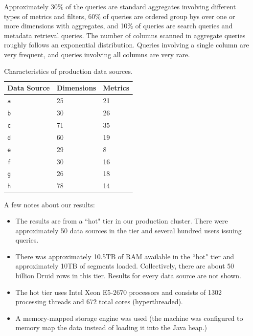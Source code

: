 \documentclass{sig-alternate-2013}
\begin{document}
Approximately 30\% of the queries are standard
aggregates involving different types of metrics and filters, 60\% of queries
are ordered group bys over one or more dimensions with aggregates, and 10\% of
queries are search queries and metadata retrieval queries. The number of
columns scanned in aggregate queries roughly follows an exponential
distribution. Queries involving a single column are very frequent, and queries
involving all columns are very rare.

\begin{table}
  \centering
  \begin{tabular}{| l | l | l |}
    \hline
    \textbf{Data Source} & \textbf{Dimensions} & \textbf{Metrics} \\ \hline
    \texttt{a} & 25 & 21 \\ \hline
    \texttt{b} & 30 & 26 \\ \hline
    \texttt{c} & 71 & 35 \\ \hline
    \texttt{d} & 60 & 19 \\ \hline
    \texttt{e} & 29 & 8 \\ \hline
    \texttt{f} & 30 & 16 \\ \hline
    \texttt{g} & 26 & 18 \\ \hline
    \texttt{h} & 78 & 14 \\ \hline
  \end{tabular}
  \caption{Characteristics of production data sources.}
  \label{tab:datasources}
\end{table}

A few notes about our results:
\begin{itemize}[leftmargin=*,beginpenalty=5000,topsep=0pt]
\item The results are from a ``hot" tier in our production cluster. There were
approximately 50 data sources in the tier and several hundred users issuing
queries.

\item There was approximately 10.5TB of RAM available in the ``hot" tier and
approximately 10TB of segments loaded. Collectively,
there are about 50 billion Druid rows in this tier. Results for
every data source are not shown.

\item The hot tier uses Intel Xeon E5-2670 processors and consists of 1302 processing
threads and 672 total cores (hyperthreaded).

\item A memory-mapped storage engine was used (the machine was configured to
    memory map the data instead of loading it into the Java heap.)
\end{itemize}
\end{document}
